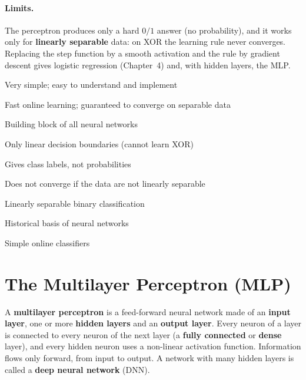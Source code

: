 \paragraph{Limits.} The perceptron produces only a hard $0/1$ answer (no probability), and it works only for \textbf{linearly separable} data: on XOR the learning rule never converges. Replacing the step function by a smooth activation and the rule by gradient descent gives logistic regression (Chapter~4) and, with hidden layers, the MLP.

{\item Very simple; easy to understand and implement
 \item Fast online learning; guaranteed to converge on separable data
 \item Building block of all neural networks}
{\item Only linear decision boundaries (cannot learn XOR)
 \item Gives class labels, not probabilities
 \item Does not converge if the data are not linearly separable}
{\item Linearly separable binary classification
 \item Historical basis of neural networks
 \item Simple online classifiers}

\section{The Multilayer Perceptron (MLP)}

\begin{definition}
A \textbf{multilayer perceptron} is a feed-forward neural network made of an \textbf{input layer}, one or more \textbf{hidden layers} and an \textbf{output layer}. Every neuron of a layer is connected to every neuron of the next layer (a \textbf{fully connected} or \textbf{dense} layer), and every hidden neuron uses a non-linear activation function. Information flows only forward, from input to output. A network with many hidden layers is called a \textbf{deep neural network} (DNN).
\end{definition}

